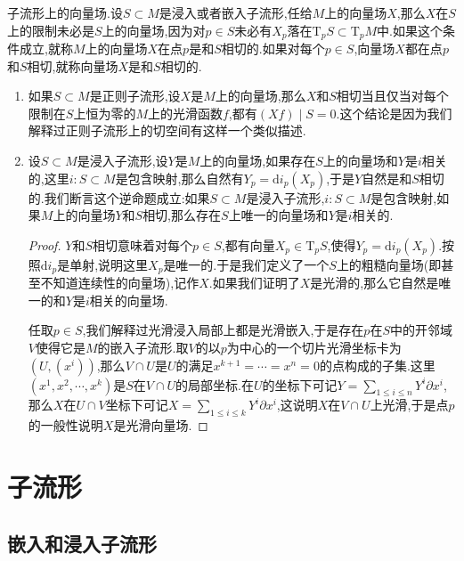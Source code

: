 子流形上的向量场.设$S\subset M$是浸入或者嵌入子流形,任给$M$上的向量场$X$,那么$X$在$S$上的限制未必是$S$上的向量场,因为对$p\in S$未必有$X_p$落在$\mathrm{T}_pS\subset\mathrm{T}_pM$中.如果这个条件成立,就称$M$上的向量场$X$在点$p$是和$S$相切的.如果对每个$p\in S$,向量场$X$都在点$p$和$S$相切,就称向量场$X$是和$S$相切的.
\begin{enumerate}
	\item 如果$S\subset M$是正则子流形,设$X$是$M$上的向量场,那么$X$和$S$相切当且仅当对每个限制在$S$上恒为零的$M$上的光滑函数$f$,都有$(Xf)\mid S=0$.这个结论是因为我们解释过正则子流形上的切空间有这样一个类似描述.
	\item 设$S\subset M$是浸入子流形,设$Y$是$M$上的向量场,如果存在$S$上的向量场和$Y$是$i$相关的,这里$i:S\subset M$是包含映射,那么自然有$Y_p=\mathrm{d}i_p(X_p)$,于是$Y$自然是和$S$相切的.我们断言这个逆命题成立:如果$S\subset M$是浸入子流形,$i:S\subset M$是包含映射,如果$M$上的向量场$Y$和$S$相切,那么存在$S$上唯一的向量场和$Y$是$i$相关的.
	\begin{proof}
		
		$Y$和$S$相切意味着对每个$p\in S$,都有向量$X_p\in\mathrm{T}_pS$,使得$Y_p=\mathrm{d}i_p(X_p)$.按照$\mathrm{d}i_p$是单射,说明这里$X_p$是唯一的.于是我们定义了一个$S$上的粗糙向量场(即甚至不知道连续性的向量场),记作$X$.如果我们证明了$X$是光滑的,那么它自然是唯一的和$Y$是$i$相关的向量场.
		
		任取$p\in S$,我们解释过光滑浸入局部上都是光滑嵌入,于是存在$p$在$S$中的开邻域$V$使得它是$M$的嵌入子流形.取$V$的以$p$为中心的一个切片光滑坐标卡为$(U,(x^i))$,那么$V\cap U$是$U$的满足$x^{k+1}=\cdots=x^n=0$的点构成的子集.这里$(x^1,x^2,\cdots,x^k)$是$S$在$V\cap U$的局部坐标.在$U$的坐标下可记$Y=\sum_{1\le i\le n}Y^i\partial x^i$,那么$X$在$U\cap V$坐标下可记$X=\sum_{1\le i\le k}Y^i\partial x^i$,这说明$X$在$V\cap U$上光滑,于是点$p$的一般性说明$X$是光滑向量场.
	\end{proof}
\end{enumerate}

\newpage
\section{子流形}
\subsection{嵌入和浸入子流形}


